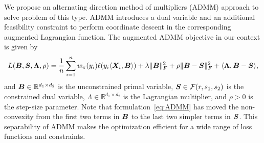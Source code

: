 \documentclass[11pt]{article}
\theoremstyle{plain}
\theoremstyle{definition}
\begin{document}
We propose an alternating direction method of multipliers (ADMM) approach to solve problem of this type. ADMM introduces a dual variable and an additional feasibility constraint to perform coordinate descent in the corresponding augmented Lagrangian function. The augmented ADMM objective in our context is given by
\begin{equation}\label{eq:ADMM}
L(\bm B,\bm S,\bm{\Lambda},\rho)={1\over n}\sum_{i=1}^nw_\pi(y_i)\ell(y_i\langle \bm X_i,\bm B \rangle) + \lambda\lVert\bm B\rVert_F^2+\rho\lVert\bm B-\bm S\rVert_F^2+\langle \bm{\Lambda}, \bm B-\bm S\rangle,
\end{equation}
and $\bm B\in \mathbb{R}^{d_1\times d_2}$ is the unconstrained primal variable, $\bm S\in\mathcal{F}(r,s_1,s_2)$ is the constrained dual variable, $\Lambda\in\mathbb{R}^{d_1\times d_2}$ is the  Lagrangian multiplier, and $\rho>0$ is the step-size parameter. Note that formulation~\eqref{eq:ADMM} has moved the non-convexity from the first two terms in $\bm B$ to the last two simpler terms in $\bm S$. This separability of ADMM makes the optimization efficient for a wide range of loss functions and constraints. 
\end{document}
